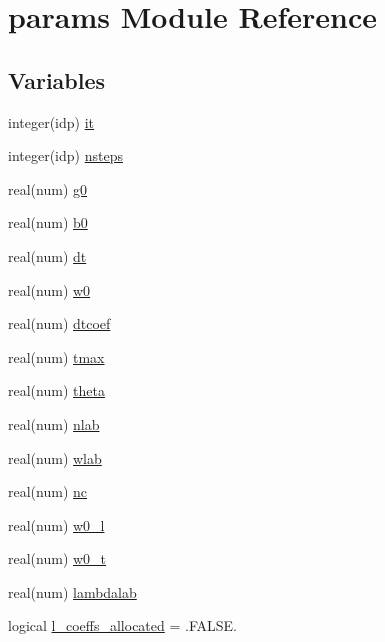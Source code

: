 \hypertarget{namespaceparams}{}\section{params Module Reference}
\label{namespaceparams}
\subsection*{Variables}
\begin{DoxyCompactItemize}
\item 
integer(idp) \hyperlink{namespaceparams_aa53b49f79463d25c9fe7a51e6b990067}{it}
\item 
integer(idp) \hyperlink{namespaceparams_af579aad3e0f1bb760fb94ef0bf1c4b0a}{nsteps}
\item 
real(num) \hyperlink{namespaceparams_af27554c70c98a90a2d5fbd7a4083f366}{g0}
\item 
real(num) \hyperlink{namespaceparams_a856909cec83e772b7266d146b4e70d7f}{b0}
\item 
real(num) \hyperlink{namespaceparams_aab5b9003ea4155de1cb7c0a3366e0b73}{dt}
\item 
real(num) \hyperlink{namespaceparams_a5351cde6ada6e860eae678ba5e6453a5}{w0}
\item 
real(num) \hyperlink{namespaceparams_a565cff6b9c99bcab68c1ae3af5f03d9e}{dtcoef}
\item 
real(num) \hyperlink{namespaceparams_afb32b5ca9f2ce80f08c5098d46a45750}{tmax}
\item 
real(num) \hyperlink{namespaceparams_ae4f22fd44655050055d203271b8b4025}{theta}
\item 
real(num) \hyperlink{namespaceparams_a977c294dda0d117791fd0e6f7c9bdad5}{nlab}
\item 
real(num) \hyperlink{namespaceparams_a040901e6fd1ee6a06ba4f9a9829d0427}{wlab}
\item 
real(num) \hyperlink{namespaceparams_adb7d5f7cb5d7431bdf0e5a8ea5b1ad56}{nc}
\item 
real(num) \hyperlink{namespaceparams_a099f9a730e6ea2a9410eb86769458372}{w0\+\_\+l}
\item 
real(num) \hyperlink{namespaceparams_a7a94c587421680abbe506082d28ff8b6}{w0\+\_\+t}
\item 
real(num) \hyperlink{namespaceparams_a24b22ed48dbf0d3d0f582e6db7d40a76}{lambdalab}
\item 
logical \hyperlink{namespaceparams_abbe8f0ac16d41f275328feb0a5d63fed}{l\+\_\+coeffs\+\_\+allocated} = .F\+A\+L\+S\+E.
\item 

\end{DoxyCompactItemize}
